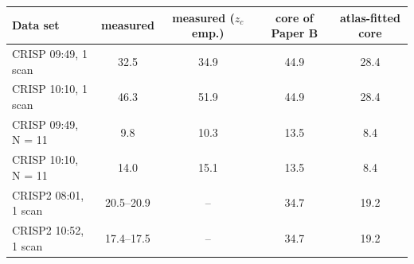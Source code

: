 \begin{tabular}{lcccc}
\hline
Data set & measured & measured ($z_c$ emp.) & core of Paper B & atlas-fitted core \\
\hline
CRISP 09:49, 1 scan & 32.5 & 34.9 & 44.9 & 28.4 \\
CRISP 10:10, 1 scan & 46.3 & 51.9 & 44.9 & 28.4 \\
CRISP 09:49, N = 11 & 9.8 & 10.3 & 13.5 & 8.4 \\
CRISP 10:10, N = 11 & 14.0 & 15.1 & 13.5 & 8.4 \\
CRISP2 08:01, 1 scan & 20.5--20.9 & -- & 34.7 & 19.2 \\
CRISP2 10:52, 1 scan & 17.4--17.5 & -- & 34.7 & 19.2 \\
\hline
\end{tabular}
